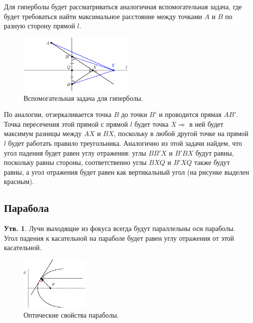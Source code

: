\documentclass[12pt]{article}
\theoremstyle{definition}
\newtheorem{prop}{Утв.}
\begin{document}
Для гиперболы будет рассматриваться аналогичная вспомогательная задача, где будет требоваться найти максимальное расстояние между точками $A$ и $B$ по разную сторону прямой $l$.
\begin{figure}[H]
	\centering
	\includegraphics[width=0.5\textwidth]{ANGL2_11.eps}
	\caption{Вспомогательная задача для гиперболы.}
	\label{2_11}
\end{figure}
По аналогии, отзеркаливается точка $B$ до точки $B'$ и проводится прямая $AB'$. Точка пересечения этой прямой с прямой $l$ будет точка $X \Rightarrow$ в ней будет максимум разницы между $AX$ и $BX$, поскольку в любой другой точке на прямой $l$ будет работать правило треугольника. Аналогично из этой задачи найдем, что угол падения будет равен углу отражения: углы $BB'X$ и $B'BX$ будут равны, поскольку равны стороны, соответственно углы $BXQ$ и $B'XQ$ также будут равны, а угол отражения будет равен как вертикальный угол (на рисунке выделен красным).

\newpage
\subsection*{Парабола}
\begin{prop}
	Лучи выходящие из фокуса всегда будут параллельны оси параболы. Угол падения к касательной на параболе будет равен углу отражения от этой касательной.
\end{prop}

\begin{figure}[H]
	\centering
	\includegraphics[width=0.3\textwidth]{ANGL2_12.eps}
	\caption{Оптические свойства параболы.}
	\label{2_12}
\end{figure}
\end{document}
